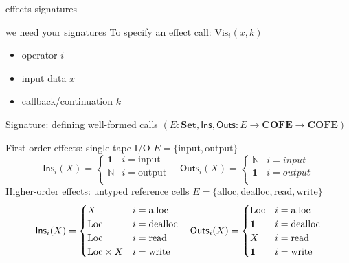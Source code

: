 \documentclass[8pt]{beamer}
\newcommand{\Ins}{\mathsf{Ins}}
\newcommand{\Outs}{\mathsf{Outs}}
\newcommand{\efinput}{\mathrm{input}}
\newcommand{\efoutput}{\mathrm{output}}
\newcommand{\efalloc}{\mathrm{alloc}}
\newcommand{\efdealloc}{\mathrm{dealloc}}
\newcommand{\efread}{\mathrm{read}}
\newcommand{\efwrite}{\mathrm{write}}
\newcommand{\Set}{\mathbf{Set}}
\newcommand{\COFE}{\mathbf{COFE}}
\newcommand{\gVis}{\mathrm{Vis}}
\begin{document}
  \begin{frame}{effects signatures}
    \begin{exampleblock}{we need your signatures}
      To specify an effect call: \(\gVis_i(x, k)\)
      \begin{itemize}
        \item operator \(i\)
        \item input data \(x\)
        \item callback/continuation \(k\)
      \end{itemize}
      Signature: defining well-formed calls \((E : \Set,\Ins, \Outs : E \to \COFE \to \COFE)\)
    \end{exampleblock}
    \pause
    First-order effects: single tape I/O \(E = \{\efinput, \efoutput\}\)
    \[
      \Ins_i(X) = \begin{cases}
        \mathbf{1} & i = \efinput\\
        \mathbb{N} & i = \efoutput\\
      \end{cases}
      \quad
      \Outs_i(X) = \begin{cases}
        \mathbb{N} & i = input\\
        \mathbf{1} & i = output\\
      \end{cases}
    \]
    Higher-order effects: untyped reference cells \(E = \{\efalloc, \efdealloc, \efread, \efwrite\}\)
    \[
      \Ins_i(X) = \begin{cases}
        X & i = \efalloc\\
        \iLoc & i = \efdealloc\\
        \iLoc & i = \efread\\
        \iLoc \times X & i = \efwrite\\
      \end{cases}
      \quad
      \Outs_i(X) = \begin{cases}
        \iLoc & i = \efalloc\\
        \mathbf{1} & i = \efdealloc\\
        X & i = \efread\\
        \mathbf{1} & i = \efwrite\\
      \end{cases}
    \]
  \end{frame}
\end{document}
